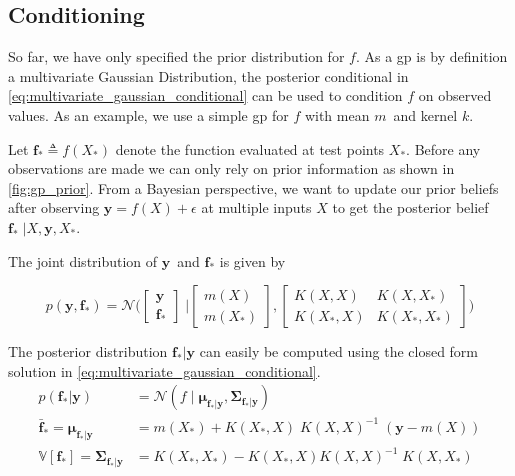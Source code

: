 \subsection{Conditioning}
So far, we have only specified the prior distribution for $f$. As a \acrshort{gp} is by definition a multivariate Gaussian Distribution, the posterior conditional in \cref{eq:multivariate_gaussian_conditional} can be used to condition $f$ on observed values. 
As an example, we use a simple \acrshort{gp} for $f$ with mean $m$ and kernel $k$.

Let $\boldsymbol{f}_* \triangleq f(X_*)$ denote the function evaluated at test points $X_*$. Before any observations are made we can only rely on prior information as shown in \cref{fig:gp_prior}. From a Bayesian perspective, we want to update our prior beliefs after observing $\boldsymbol{y} = f(X) + \epsilon$ at multiple inputs $X$ to get the posterior belief $\boldsymbol{f}_* \; | X, \boldsymbol{y}, X_*$.

The joint distribution of $\boldsymbol{y}$ and $\boldsymbol{f}_*$ is given by 

\begin{equation}
    p(\boldsymbol{y}, \boldsymbol{f}_*) = \mathcal{N}\bigg(\begin{bmatrix}
        \boldsymbol{y} \\ \boldsymbol{f}_*
    \end{bmatrix} \; \bigg| \begin{bmatrix}
        m(X) \\ m(X_*)
    \end{bmatrix},  \begin{bmatrix}
        K(X, X) & K(X, X_*) \\ K(X_*, X) & K(X_*, X_*)
    \end{bmatrix}\bigg)
\end{equation}

The posterior distribution $\boldsymbol{f}_* | \boldsymbol{y}$ can easily be computed using the closed form solution in \cref{eq:multivariate_gaussian_conditional}.
\begin{subequations}\label{eq:gp_conditional}
\begin{align}
    p(\boldsymbol{f}_* | \boldsymbol{y}) &= \mathcal{N}(f \; | \; \boldsymbol{\mu}_{\boldsymbol{f}_*|\boldsymbol{y}}, \boldsymbol{\Sigma}_{\boldsymbol{f}_*|\boldsymbol{y}})\\
    \bar{\boldsymbol{f}}_* = \boldsymbol{\mu}_{\boldsymbol{f}_* | \boldsymbol{y}} &= m(X_*) + K(X_*, X) \; K(X, X)^{-1} \; (\boldsymbol{y} - m(X))\label{eq:gp_conditional_mean}\\
    \mathbb{V}[\boldsymbol{f}_*] = \boldsymbol{\Sigma}_{\boldsymbol{f}_* | \boldsymbol{y}} &= K(X_*, X_*) - K(X_*, X)  K(X, X)^{-1} \; K(X, X_*)\label{eq:gp_conditional_var}
\end{align}
\end{subequations}

